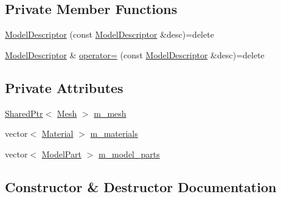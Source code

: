 \subsection*{Private Member Functions}
\begin{DoxyCompactItemize}
\item 
\hyperlink{classmage_1_1_model_descriptor_af44185efc20e10ede762d29bc454c5f3}{Model\+Descriptor} (const \hyperlink{classmage_1_1_model_descriptor}{Model\+Descriptor} \&desc)=delete
\item 
\hyperlink{classmage_1_1_model_descriptor}{Model\+Descriptor} \& \hyperlink{classmage_1_1_model_descriptor_a734b17224719896921e9f6252ee88483}{operator=} (const \hyperlink{classmage_1_1_model_descriptor}{Model\+Descriptor} \&desc)=delete
\end{DoxyCompactItemize}
\subsection*{Private Attributes}
\begin{DoxyCompactItemize}
\item 
\hyperlink{namespacemage_a1e01ae66713838a7a67d30e44c67703e}{Shared\+Ptr}$<$ \hyperlink{classmage_1_1_mesh}{Mesh} $>$ \hyperlink{classmage_1_1_model_descriptor_a89ac31356e7690007c618be387399151}{m\+\_\+mesh}
\item 
vector$<$ \hyperlink{structmage_1_1_material}{Material} $>$ \hyperlink{classmage_1_1_model_descriptor_a672238b257f99836243d84f634ffeea2}{m\+\_\+materials}
\item 
vector$<$ \hyperlink{structmage_1_1_model_part}{Model\+Part} $>$ \hyperlink{classmage_1_1_model_descriptor_a200c6e44c9b6a5bde5c8490fb93ba00f}{m\+\_\+model\+\_\+parts}
\end{DoxyCompactItemize}


\subsection{Constructor \& Destructor Documentation}
\hypertarget{classmage_1_1_model_descriptor_afbaa21bc79c40d3448c83a23c134ef2c}{}\label{classmage_1_1_model_descriptor_afbaa21bc79c40d3448c83a23c134ef2c} 
